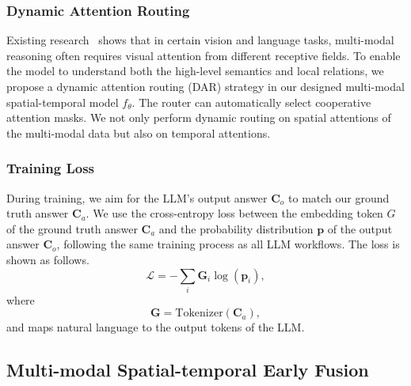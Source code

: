 \subsubsection{Dynamic Attention Routing}
Existing research~\cite{zhou2021trar,tian-etal-2023-dynamic} shows that in certain vision and language tasks, multi-modal reasoning often requires visual attention from different receptive fields. To enable the model to understand both the high-level semantics and local relations, we propose a dynamic attention routing (DAR) strategy in our designed multi-modal spatial-temporal model $f_{\theta}$. 
The router can automatically select cooperative attention masks. We not only perform dynamic routing on spatial attentions of the multi-modal data but also on temporal attentions.

\subsubsection{Training Loss}
During training, we aim for the LLM's output answer $\mathbf{C}_o$ to match our ground truth answer $\mathbf{C}_a$. We use the cross-entropy loss between the embedding token $G$ of the ground truth answer $\mathbf{C}_a$ and the probability distribution $\mathbf{p}$ of the output answer $\mathbf{C}_o$, following the same training process as all LLM workflows. The loss is shown as follows.
\begin{equation}
\label{eq:our fusion}
    \mathcal{L} = -\sum_{i} \mathbf{G}_i \log(\mathbf{p}_i),
\end{equation}
where
\begin{equation}
\label{eq:our fusion}
    \mathbf{G} = \text{Tokenizer}(\mathbf{C}_a),
\end{equation}
and  maps natural language to the output tokens of the LLM.

\subsection{Multi-modal Spatial-temporal Early Fusion}
\label{section3.2}

